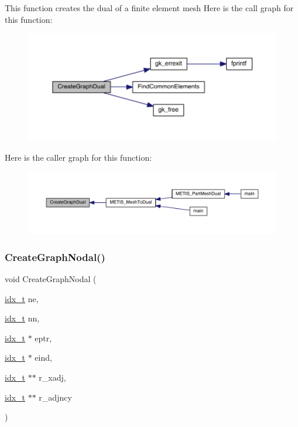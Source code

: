 This function creates the dual of a finite element mesh Here is the call graph for this function\+:\nopagebreak
\begin{figure}[H]
\begin{center}
\leavevmode
\includegraphics[width=350pt]{a00945_a10400dffe4954a697990134da62b387d_cgraph}
\end{center}
\end{figure}
Here is the caller graph for this function\+:\nopagebreak
\begin{figure}[H]
\begin{center}
\leavevmode
\includegraphics[width=350pt]{a00945_a10400dffe4954a697990134da62b387d_icgraph}
\end{center}
\end{figure}
\mbox{\label{a00945_ac6018a712a429b3c401adba913c2cae3}} 
\subsubsection{\texorpdfstring{Create\+Graph\+Nodal()}{CreateGraphNodal()}}
{\footnotesize\ttfamily void Create\+Graph\+Nodal (\begin{DoxyParamCaption}\item[{\hyperlink{a00876_aaa5262be3e700770163401acb0150f52}{idx\+\_\+t}}]{ne,  }\item[{\hyperlink{a00876_aaa5262be3e700770163401acb0150f52}{idx\+\_\+t}}]{nn,  }\item[{\hyperlink{a00876_aaa5262be3e700770163401acb0150f52}{idx\+\_\+t} $\ast$}]{eptr,  }\item[{\hyperlink{a00876_aaa5262be3e700770163401acb0150f52}{idx\+\_\+t} $\ast$}]{eind,  }\item[{\hyperlink{a00876_aaa5262be3e700770163401acb0150f52}{idx\+\_\+t} $\ast$$\ast$}]{r\+\_\+xadj,  }\item[{\hyperlink{a00876_aaa5262be3e700770163401acb0150f52}{idx\+\_\+t} $\ast$$\ast$}]{r\+\_\+adjncy }\end{DoxyParamCaption})}

